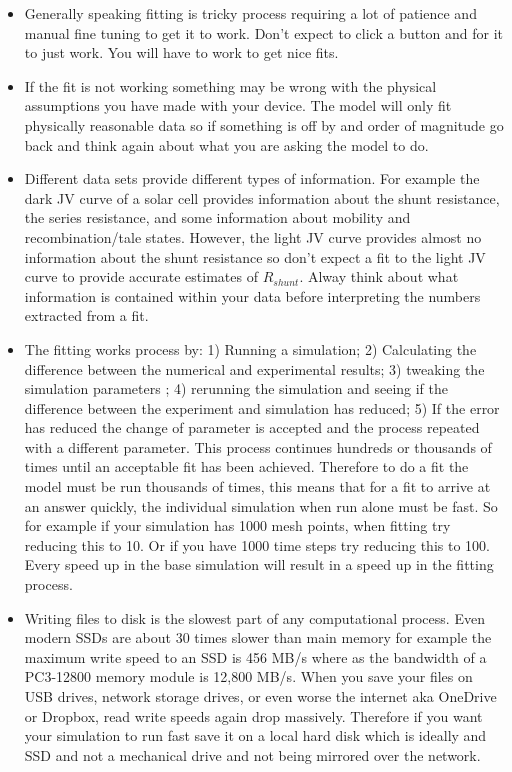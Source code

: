 \begin{itemize}
  \item 
Generally speaking fitting is tricky process requiring a lot of patience and manual fine tuning to get it to work. Don't expect to click a button and for it to just work. You will have to work to get nice fits.
  \item If the fit is not working something may be wrong with the physical assumptions you have made with your device. The model will only fit physically reasonable data so if something is off by and order of magnitude go back and think again about what you are asking the model to do.
  \item Different data sets provide different types of information. For example the dark JV curve of a solar cell provides information about the shunt resistance, the series resistance, and some information about mobility and recombination/tale states. However, the light JV curve provides almost no information about the shunt resistance so don't expect a fit to the light JV curve to provide accurate estimates of $R_{shunt}$. Alway think about what information is contained within your data before interpreting the numbers extracted from a fit.
  \item The fitting works process by: 1) Running a simulation; 2) Calculating the difference between the numerical and experimental results; 3) tweaking the simulation parameters ; 4) rerunning the simulation and seeing if the difference between the experiment and simulation has reduced; 5) If the error has reduced the change of parameter is accepted and the process repeated with a different parameter.  This process continues hundreds or thousands of times until an acceptable fit has been achieved. Therefore to do a fit the model must be run thousands of times, this means that for a fit to arrive at an answer quickly, the individual simulation when run alone must be fast. So for example if your simulation has 1000 mesh points, when fitting try reducing this to 10. Or if you have 1000 time steps try reducing this to 100. Every speed up in the base simulation will result in a speed up in the fitting process.
  \item Writing files to disk is the slowest part of any computational process. Even modern SSDs are about 30 times slower than main memory for example the maximum write speed to an SSD is 456 MB/s where as the bandwidth of a PC3-12800 memory module is  12,800 MB/s. When you save your files on USB drives, network storage drives, or even worse the internet aka OneDrive or Dropbox, read write speeds again drop massively. Therefore if you want your simulation to run fast save it on a local hard disk which is ideally and SSD and not a mechanical drive and not being mirrored over the network.

\end{itemize}
